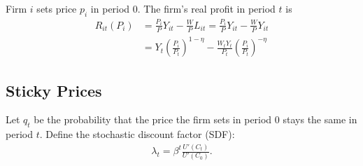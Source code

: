 \documentclass{article}
\renewcommand{\L}{\mathcal{L}}
\newcommand{\?}{\textcolor{red}{(?)}} %
\begin{document}
        Firm $i$ sets price $p_i$ in period 0. The firm's real profit in period $t$ is
        \begin{align}
            R_{it}(P_i)
            &= \frac{P_i}{P}Y_{it} - \frac{W}{P} L_{it}
            = \frac{P_i}{P}Y_{it} - \frac{W}{P} Y_{it}
            \\
            &=
            Y_t \left(\frac{{P_i}}{P_t}\right)^{1-\eta} - \frac{W_tY_t}{P_t} \left(\frac{{P_i}}{P_t}\right)^{-\eta}
        \end{align}
        
    \subsection{Sticky Prices}
    
        Let $q_t$ be the probability that the price the firm sets in period $0$ stays the same in period $t$. Define the stochastic discount factor (SDF):
        \begin{align}
            \lambda_t = \beta^t \frac{U'(C_t)}{U'(C_0)}.
        \end{align}
        
\end{document}
